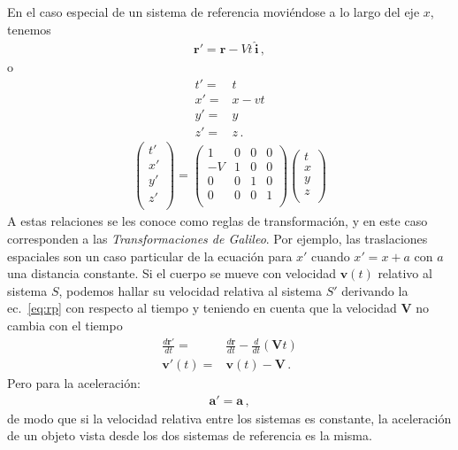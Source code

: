 En el caso especial de un sistema de referencia moviéndose a lo largo
del eje $x$, tenemos
\begin{align}
  \mathbf{r}'=\mathbf{r}-V t\,\hat{\mathbf{i}}\,,
\end{align}
o
\begin{align}
  t'=&t\nonumber\\
  x'=&x-vt\nonumber\\
  y'=&y\nonumber\\
  z'=&z\,.
\end{align}
\begin{align}
  \begin{pmatrix}
    t'\\
    x'\\
    y'\\
    z'\\
  \end{pmatrix}=
  \begin{pmatrix}
    1&0&0&0\\
    -V&1&0&0\\
    0&0&1&0\\
    0&0&0&1\\
  \end{pmatrix}
  \begin{pmatrix}
    t\\
    x\\
    y\\
    z\\
  \end{pmatrix}
\end{align}
A estas relaciones se les conoce como reglas de transformación, y en
este caso corresponden a las \emph{Transformaciones de Galileo}.
Por ejemplo, las traslaciones espaciales son un caso particular de la
ecuación para $x'$ cuando $x'=x+a$ con $a$ una distancia constante.
Si el cuerpo se mueve con velocidad $\mathbf{v}(t)$ relativo al
sistema $S$, podemos hallar su velocidad relativa al sistema $S'$
derivando la ec.~\eqref{eq:rp} con respecto al tiempo y teniendo en
cuenta que la velocidad $\mathbf{V}$ no cambia con el tiempo
\begin{align}
\frac{d\mathbf{r}'}{dt}=&\frac{d\mathbf{r}}{dt}-\frac{d}{dt}\left(\mathbf{V}t\right)\nonumber\\
  \mathbf{v}'(t)=&\mathbf{v}(t)-\mathbf{V}\,.
\end{align}
Pero para la aceleración:
\begin{align}
  \mathbf{a}'=\mathbf{a}\,,
\end{align}
de modo que si la velocidad relativa entre los sistemas es constante,
la aceleración de un objeto vista desde los dos sistemas de referencia
es la misma.

